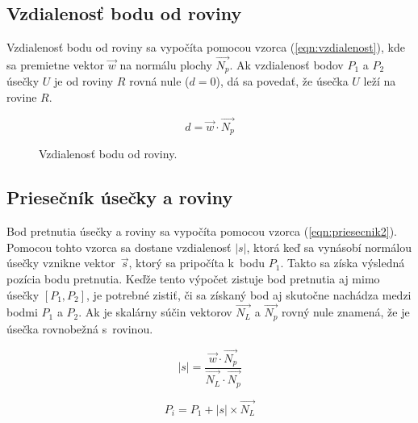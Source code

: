 \subsection{Vzdialenosť bodu od roviny}\label{Sec:Vzdialenost}

Vzdialenosť bodu od roviny sa vypočíta pomocou vzorca (\ref{eqn:vzdialenost}), kde sa premietne vektor $\overrightarrow{w}$ na normálu plochy $\overrightarrow{N_{p}}$.
Ak vzdialenosť bodov $P_{1}$ a $P_{2}$  úsečky $U$ je od roviny $R$ rovná nule ($d=0$), dá sa povedať, že úsečka $U$ leží na rovine $R$.

\begin{equation}
d = \overrightarrow{w}\cdot \overrightarrow{N_{p}}
\label{eqn:vzdialenost}
\end{equation}


\begin{figure}[H]
\centering
{}
\caption{Vzdialenosť bodu od roviny.}
\label{fig:distancePointFromPlane}
\end{figure}



\subsection{Priesečník úsečky a roviny}


Bod pretnutia úsečky a roviny sa vypočíta pomocou vzorca (\ref{eqn:priesecnik2}). Pomocou tohto vzorca sa dostane vzdialenosť $\left | s \right |$, ktorá keď sa vynásobí normálou úsečky vznikne vektor~$\overrightarrow{s}$, ktorý sa pripočíta k~bodu $P_{1}$. Takto sa získa výsledná pozícia bodu pretnutia. Keďže tento výpočet zistuje bod pretnutia aj mimo úsečky $[P_{1}, P_{2}]$, je potrebné zistiť, či sa získaný bod aj skutočne nachádza medzi bodmi $P_{1}$ a $P_{2}$.
Ak je skalárny súčin vektorov $\overrightarrow{N_{L}}$ a $\overrightarrow{N_{p}}$ rovný nule znamená, že je úsečka rovnobežná s~rovinou.

\begin{equation}
\left | s \right |= \frac{\overrightarrow{w}\cdot \overrightarrow{N_{p}}}{\overrightarrow{N_{L}} \cdot \overrightarrow{N_{p}}}
\label{eqn:priesecnik1}
\end{equation}

\begin{equation}
P_{i} = P_{1} + \left | s \right | \times \overrightarrow{N_{L}}
\label{eqn:priesecnik2}
\end{equation}



